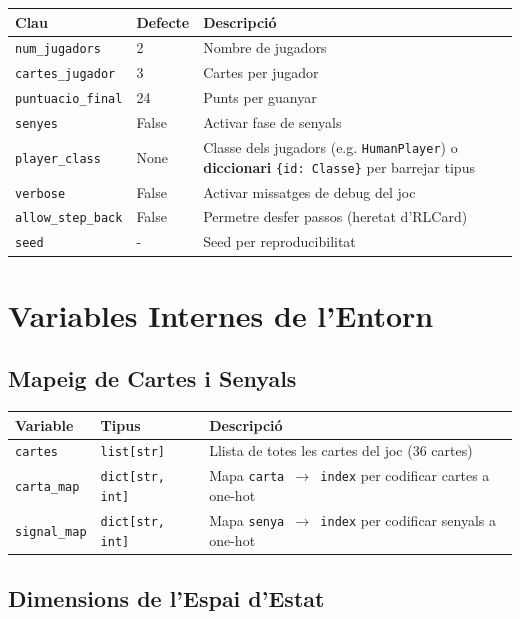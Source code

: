 \documentclass[a4paper,11pt]{report}
\begin{document}
\begin{longtable}{|l|l|p{8cm}|}
\hline
\textbf{Clau} & \textbf{Defecte} & \textbf{Descripció} \\
\hline
\texttt{num\_jugadors} & 2 & Nombre de jugadors \\
\texttt{cartes\_jugador} & 3 & Cartes per jugador \\
\texttt{puntuacio\_final} & 24 & Punts per guanyar \\
\texttt{senyes} & False & Activar fase de senyals \\
\texttt{player\_class} & None & Classe dels jugadors (e.g. \texttt{HumanPlayer}) o \textbf{diccionari} \texttt{\{id: Classe\}} per barrejar tipus \\
\texttt{verbose} & False & Activar missatges de debug del joc \\
\texttt{allow\_step\_back} & False & Permetre desfer passos (heretat d'RLCard) \\
\texttt{seed} & - & Seed per reproducibilitat \\
\hline
\end{longtable}

\hrulefill

\section{Variables Internes de l'Entorn}

\subsection{Mapeig de Cartes i Senyals}

\begin{longtable}{|l|l|p{8cm}|}
\hline
\textbf{Variable} & \textbf{Tipus} & \textbf{Descripció} \\
\hline
\texttt{cartes} & \texttt{list[str]} & Llista de totes les cartes del joc (36 cartes) \\
\texttt{carta\_map} & \texttt{dict[str, int]} & Mapa \texttt{carta $\rightarrow$ index} per codificar cartes a one-hot \\
\texttt{signal\_map} & \texttt{dict[str, int]} & Mapa \texttt{senya $\rightarrow$ index} per codificar senyals a one-hot \\
\hline
\end{longtable}

\subsection{Dimensions de l'Espai d'Estat}
\end{document}
